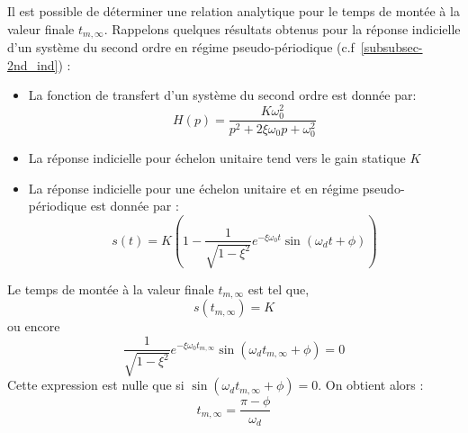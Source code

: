 Il est possible de déterminer une relation analytique pour le temps
de montée à la valeur finale $t_{m,\infty}$. Rappelons quelques résultats 
obtenus pour la réponse indicielle d'un système du second ordre en régime 
pseudo-périodique (c.f~\cref{subsubsec-2nd_ind}) :
\begin{itemize}
\item La fonction de transfert d'un système du second ordre est donnée
par:
$$
H(p)=\dfrac{K\omega_0^2}{p^2+2\xi\omega_0p+\omega_0^2}
$$
\item La réponse indicielle pour échelon unitaire tend vers 
      le gain statique $K$ 
\item La réponse indicielle pour une échelon unitaire et en régime 
      pseudo-périodique est donnée par : 
$$
    s(t) = K \left( 1 - 
           \dfrac{1}{\sqrt{1-\xi^2}} 
           e^{-\xi\omega_0 t}
           \sin{(\omega_d t+\phi)}\right)\label{eq-2-3_2nd} 
$$
\end{itemize}
Le temps de montée à la valeur finale $t_{m,\infty}$ est tel que, 
$$
s(t_{m,\infty})=K
$$
ou encore  
$$
\dfrac{1}{\sqrt{1-\xi^2}}
e^{-\xi\omega_0 t_{m,\infty}}
\sin{(\omega_d t_{m,\infty}+\phi)}=0
$$
Cette expression est nulle que si $\sin{(\omega_d t_{m,\infty}+\phi)}=0$.
On obtient alors :
$$
t_{m,\infty}=\dfrac{\pi-\phi}{\omega_d}
$$

